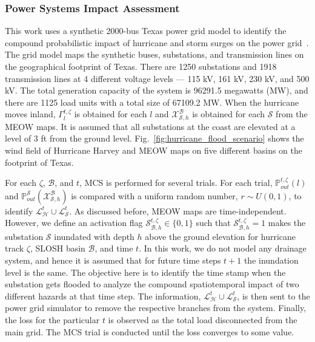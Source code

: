 \documentclass[hidelinks, 12pt]{article}
\begin{document}
\subsubsection{Power Systems Impact Assessment}
This work uses a synthetic 2000-bus Texas power grid model to identify the compound probabilistic impact of hurricane and storm surges on the power grid~\cite{7725528}. The grid model maps the synthetic buses, substations, and transmission lines on the geographical footprint of Texas. There are 1250 substations and 1918 transmission lines at 4 different voltage levels --- 115 kV, 161 kV, 230 kV, and 500 kV. The total generation capacity of the system is 96291.5 megawatts (MW), and there are 1125 load units with a total size of 67109.2 MW. When the hurricane moves inland, $\Gamma_{l}^{t,\zeta}$ is obtained for each $l$ and $\mathcal{X}^\mathcal{B}_{\mathcal{S}, h}$ is obtained for each $\mathcal{S}$ from the MEOW maps. It is assumed that all substations at the coast are elevated at a level of 3 ft from the ground level. Fig.~\ref{fig:hurricane_flood_scenario} shows the wind field of Hurricane Harvey and MEOW maps on five different basins on the footprint of Texas.     

For each $\zeta$, $\mathcal{B}$, and $t$, MCS is performed for several trials. For each trial, $\mathbb{P}_{out}^{t,\zeta}(l)$ and $\mathbb{P}^{\mathcal{S}}_{out}(\mathcal{X}^\mathcal{B}_{\mathcal{S}, h})$ is compared with a uniform random number, $r\sim U(0,1)$, to identify $\mathcal{L}^t_\mathcal{H} \cup \mathcal{L}^t_\mathcal{S}$. As discussed before, MEOW maps are time-independent. However, we define an activation flag $\mathcal{S}^{t, \zeta}_{\mathcal{B}, h} \in \{0,1\}$ such that $\mathcal{S}^{t, \zeta}_{\mathcal{B},h} = 1$ makes the substation $\mathcal{S}$ inundated with depth $h$ above the ground elevation for hurricane track $\zeta$, SLOSH basin $\mathcal{B}$, and time $t$. In this work, we do not model any drainage system, and hence it is assumed that for future time steps $t+1$ the inundation level is the same. The objective here is to identify the time stamp when the substation gets flooded to analyze the compound spatiotemporal impact of two different hazards at that time step. The information, $\mathcal{L}^t_\mathcal{H} \cup \mathcal{L}^t_\mathcal{S}$, is then sent to the power grid simulator to remove the respective branches from the system. Finally, the loss for the particular $t$ is observed as the total load disconnected from the main grid. The MCS trial is conducted until the loss converges to some value.
\end{document}
